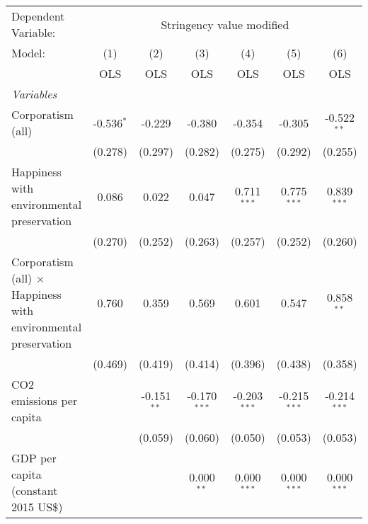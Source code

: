 
\begingroup
\centering
\begin{tabular}{lcccccc}
   \toprule
   Dependent Variable: & \multicolumn{6}{c}{Stringency value modified}\\
   Model:                                                                & (1)          & (2)           & (3)            & (4)            & (5)            & (6)\\  
                                                                         &  OLS         & OLS           & OLS            & OLS            & OLS            & OLS\\  
   \midrule
   \emph{Variables}\\
   Corporatism (all)                                                     & -0.536$^{*}$ & -0.229        & -0.380         & -0.354         & -0.305         & -0.522$^{**}$\\   
                                                                         & (0.278)      & (0.297)       & (0.282)        & (0.275)        & (0.292)        & (0.255)\\   
   Happiness with environmental preservation                             & 0.086        & 0.022         & 0.047          & 0.711$^{***}$  & 0.775$^{***}$  & 0.839$^{***}$\\   
                                                                         & (0.270)      & (0.252)       & (0.263)        & (0.257)        & (0.252)        & (0.260)\\   
   Corporatism (all) $\times$ Happiness with environmental preservation  & 0.760        & 0.359         & 0.569          & 0.601          & 0.547          & 0.858$^{**}$\\   
                                                                         & (0.469)      & (0.419)       & (0.414)        & (0.396)        & (0.438)        & (0.358)\\   
   CO2 emissions per capita                                              &              & -0.151$^{**}$ & -0.170$^{***}$ & -0.203$^{***}$ & -0.215$^{***}$ & -0.214$^{***}$\\   
                                                                         &              & (0.059)       & (0.060)        & (0.050)        & (0.053)        & (0.053)\\   
   GDP per capita (constant 2015 US\$)                                   &              &               & 0.000$^{**}$   & 0.000$^{***}$  & 0.000$^{***}$  & 0.000$^{***}$\\   

\end{tabular}
